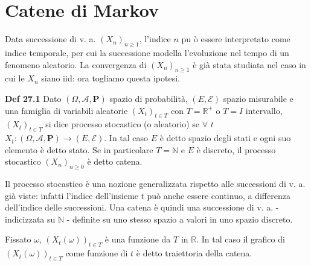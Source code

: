 \documentclass{article}
\begin{document}
\section{Catene di Markov}

Data successione di v. a. $\left( X_{n}\right) _{n\geq 1}$, l'indice $n$ pu%
\`{o} essere interpretato come indice temporale, per cui la successione
modella l'evoluzione nel tempo di un fenomeno aleatorio. La convergenza di $%
\left( X_{n}\right) _{n\geq 1}$ \`{e} gi\`{a} stata studiata nel caso in cui
le $X_{n}$ siano iid: ora togliamo questa ipotesi.

\textbf{Def 27.1} Dato $\left( \Omega ,\mathcal{A},\mathbf{P}\right) $
spazio di probabilit\`{a}, $\left( E,\mathcal{E}\right) $ spazio misurabile
e una famiglia di variabili aleatorie $\left( X_{t}\right) _{t\in T}$ con $T=%
\mathbb{R}
^{+}$ o $T=I$ intervallo, $\left( X_{t}\right) _{t\in T}$ si dice processo
stocastico (o aleatorio) se $\forall $ $t$ $X_{t}:\left( \Omega ,\mathcal{A},%
\mathbf{P}\right) \rightarrow \left( E,\mathcal{E}\right) $. In tal caso $E$ 
\`{e} detto spazio degli stati e ogni suo elemento \`{e} detto stato. Se in
particolare $T=%
\mathbb{N}
$ e $E$ \`{e} discreto, il processo stocastico $\left( X_{n}\right) _{n\geq
0}$ \`{e} detto catena.

Il processo stocastico \`{e} una nozione generalizzata rispetto alle
successioni di v. a. gi\`{a} viste: infatti l'indice dell'insieme $t$ pu\`{o}
anche essere continuo, a differenza dell'indice delle successioni. Una
catena \`{e} quindi una successione di v. a. - indicizzata su $%
\mathbb{N}
$ - definite su uno stesso spazio a valori in uno spazio discreto.

Fissato $\omega $, $\left( X_{t}\left( \omega \right) \right) _{t\in T}$ 
\`{e} una funzione da $T$ in $%
\mathbb{R}
$. In tal caso il grafico di $\left( X_{t}\left( \omega \right) \right)
_{t\in T}$ come funzione di $t$ \`{e} detto traiettoria della catena.
\end{document}
